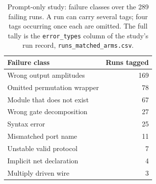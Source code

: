 \begin{table}[ht]
\centering
\caption{Prompt-only study: failure classes over the 289 failing runs. A run can carry several tags; four tags occurring once each are omitted. The full tally is the \texttt{error\_types} column of the study's run record, \texttt{runs\_matched\_arms.csv}.}
\label{tab:failures}
\begin{tabular}{@{}lr@{}}
\toprule
Failure class & Runs tagged \\
\midrule
Wrong output amplitudes & 169 \\
Omitted permutation wrapper & 78 \\
Module that does not exist & 67 \\
Wrong gate decomposition & 27 \\
Syntax error & 25 \\
Mismatched port name & 11 \\
Unstable valid protocol & 7 \\
Implicit net declaration & 4 \\
Multiply driven wire & 3 \\
\bottomrule
\end{tabular}
\end{table}

